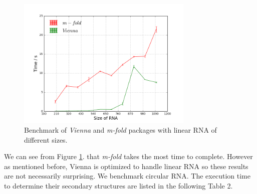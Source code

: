 \documentclass[12pt]{article}
\begin{document}
\begin{figure}[H]
    \centering
    \includegraphics[width=0.75\textwidth]{l-m-v.png}
    \caption{Benchmark of \textit{Vienna} and \textit{m-fold} packages with linear RNA of different sizes.}
    \label{fig:linear}
\end{figure}

We can see from Figure \ref{fig:linear}. that \textit{m-fold} takes the most time to complete. However as mentioned before, Vienna
is optimized to handle linear RNA so these results are not necessarily surprising.
We benchmark circular RNA. The execution time to determine their secondary structures are listed in the following Table 2.
\end{document}

